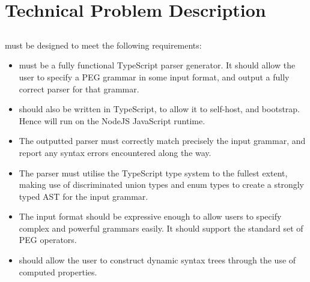\chapter{Technical Problem Description}
\section{\tsPEG{}}
\tsPEG{} must be designed to meet the following requirements:

 \begin{itemize}
     \item \tsPEG{} must be a fully functional TypeScript parser generator. It should allow the user to specify a PEG grammar in some input format, and output a fully correct parser for that grammar.
 
     \item \tsPEG{} should also be written in TypeScript, to allow it to self-host, and bootstrap. Hence \tsPEG{} will run on the NodeJS JavaScript runtime.
 
     \item The outputted parser must correctly match precisely the input grammar, and report any syntax errors encountered along the way.
 
     \item The parser must utilise the TypeScript type system to the fullest extent, making use of discriminated union types and enum types to create a strongly typed AST for the input grammar.
 
     \item The \tsPEG{} input format should be expressive enough to allow users to specify complex and powerful grammars easily. It should support the standard set of PEG operators.

     \item \tsPEG{} should allow the user to construct dynamic syntax trees through the use of computed properties.
 \end{itemize}

\section{\Setanta{}}

